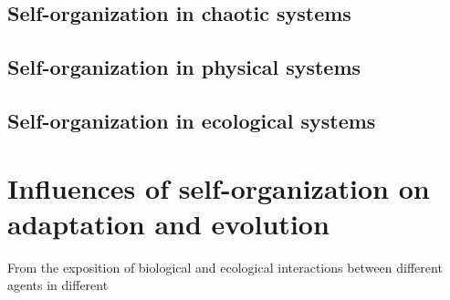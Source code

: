 \subsection{Self-organization in chaotic systems}
\subsection{Self-organization in physical systems}
\subsection{Self-organization in ecological systems}

\section{Influences of self-organization on adaptation and evolution}
From the exposition of biological and ecological interactions between different agents in different
